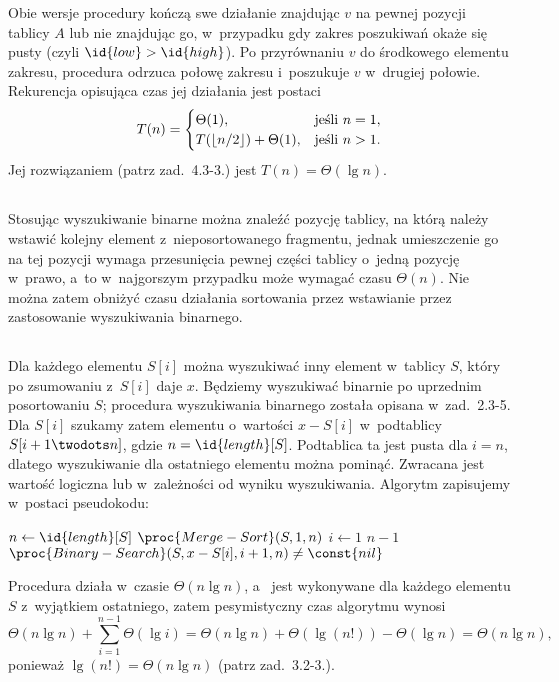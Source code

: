 Obie wersje procedury  kończą swe działanie znajdując $v$ na pewnej pozycji tablicy $A$ lub nie znajdując go, w~przypadku gdy zakres poszukiwań okaże się pusty (czyli $\id{low}>\id{high}$). Po przyrównaniu $v$ do środkowego elementu zakresu, procedura odrzuca połowę zakresu i~poszukuje $v$ w~drugiej połowie. Rekurencja opisująca czas jej działania jest postaci
\[
	T(n) =
	\begin{cases}
		\Theta(1), & \hbox{jeśli }n=1, \\
		T(\lfloor n/2\rfloor)+\Theta(1), & \hbox{jeśli }n>1.
	\end{cases}
\]
Jej rozwiązaniem (patrz zad.~4.3-3.) jest $T(n)=\Theta(\lg n)$.

\subsection{} %
Stosując wyszukiwanie binarne można znaleźć pozycję tablicy, na którą należy wstawić kolejny element z~nieposortowanego fragmentu, jednak umieszczenie go na tej pozycji wymaga przesunięcia pewnej części tablicy o~jedną pozycję w~prawo, a~to w~najgorszym przypadku może wymagać czasu $\Theta(n)$. Nie można zatem obniżyć czasu działania sortowania przez wstawianie przez zastosowanie wyszukiwania binarnego.

\subsection{} %
Dla każdego elementu $S[i]$ można wyszukiwać inny element w~tablicy $S$, który po zsumowaniu z~$S[i]$ daje $x$. Będziemy wyszukiwać binarnie po uprzednim posortowaniu $S$; procedura wyszukiwania binarnego została opisana w~zad.~\hbox{2.3-5}. Dla $S[i]$ szukamy zatem elementu o~wartości $x-S[i]$ w~podtablicy $S[i+1\twodots n]$, gdzie $n=\id{length}[S]$. Podtablica ta jest pusta dla $i=n$, dlatego wyszukiwanie dla ostatniego elementu można pominąć. Zwracana jest wartość logiczna  lub  w~zależności od wyniku wyszukiwania. Algorytm zapisujemy w~postaci pseudokodu:
\begin{codebox}
\li	$n\gets\id{length}[S]$
\li	$\proc{Merge-Sort}(S,1,n)$
\li	\For $i\gets1$ \To $n-1$
\li		\Do
			\If $\proc{Binary-Search}(S,x-S[i],i+1,n)\ne\const{nil}$
\li				\Then
					\Return{}
				\End
		\End
\li	\Return{}
\end{codebox}

Procedura  działa w~czasie $\Theta(n\lg n)$, a~ jest wykonywane dla każdego elementu $S$ z~wyjątkiem ostatniego, zatem pesymistyczny czas algorytmu  wynosi
\[
	\Theta(n\lg n)+\sum_{i=1}^{n-1}\Theta(\lg i) = \Theta(n\lg n)+\Theta(\lg(n!))-\Theta(\lg n) = \Theta(n\lg n),
\]
ponieważ $\lg(n!)=\Theta(n\lg n)$ (patrz zad.~3.2-3.).

